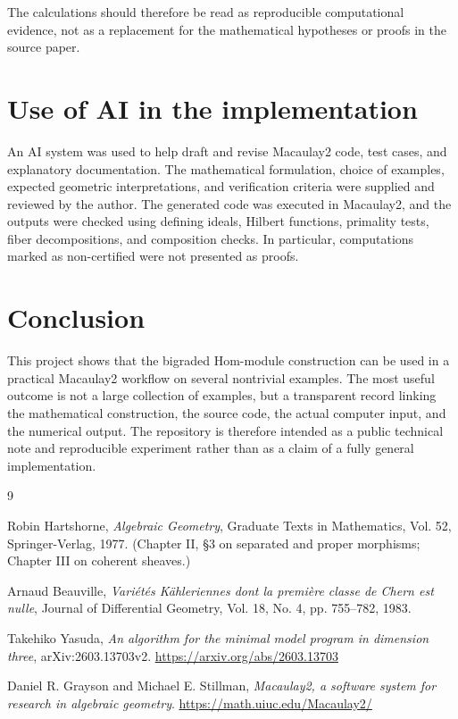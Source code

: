 \documentclass[a4paper,11pt]{article}
\begin{document}
The calculations should therefore be read as reproducible computational evidence, not as
a replacement for the mathematical hypotheses or proofs in the source paper.

\section{Use of AI in the implementation}

An AI system was used to help draft and revise Macaulay2 code, test cases, and explanatory
documentation. The mathematical formulation, choice of examples, expected geometric
interpretations, and verification criteria were supplied and reviewed by the author.
The generated code was executed in Macaulay2, and the outputs were checked using defining
ideals, Hilbert functions, primality tests, fiber decompositions, and composition checks.
In particular, computations marked as non-certified were not presented as proofs.

\section{Conclusion}

This project shows that the bigraded Hom-module construction can be used in a practical
Macaulay2 workflow on several nontrivial examples. The most useful outcome is not a large
collection of examples, but a transparent record linking the mathematical construction,
the source code, the actual computer input, and the numerical output. The repository is
therefore intended as a public technical note and reproducible experiment rather than as
a claim of a fully general implementation.

\begin{thebibliography}{9}

Robin Hartshorne,
\emph{Algebraic Geometry},
Graduate Texts in Mathematics, Vol. 52, Springer-Verlag, 1977.
(Chapter II, \S3 on separated and proper morphisms; Chapter III on coherent sheaves.)

Arnaud Beauville,
\emph{Variétés Kähleriennes dont la première classe de Chern est nulle},
Journal of Differential Geometry, Vol. 18, No. 4, pp. 755--782, 1983.

Takehiko Yasuda,
\emph{An algorithm for the minimal model program in dimension three},
arXiv:2603.13703v2.
\url{https://arxiv.org/abs/2603.13703}

Daniel R. Grayson and Michael E. Stillman,
\emph{Macaulay2, a software system for research in algebraic geometry}.
\url{https://math.uiuc.edu/Macaulay2/}

\end{thebibliography}
\end{document}
